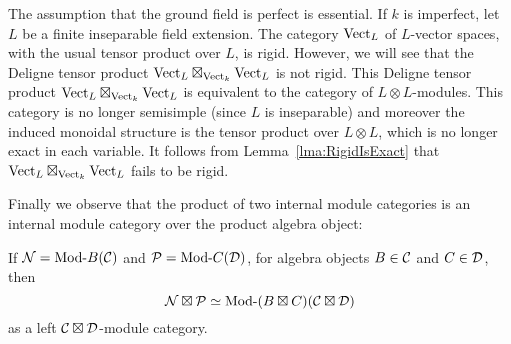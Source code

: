 \documentclass{amsart}
\begin{document}
\begin{example}
	The assumption that the ground field is perfect is essential. If $k$ is imperfect, let $L$ be a finite inseparable field extension.  The category $\mathrm{Vect}_L$ of $L$-vector spaces, with the usual tensor product over $L$, is rigid.  However, we will see that the Deligne tensor product $\mathrm{Vect}_L \boxtimes_{\mathrm{Vect}_k} \mathrm{Vect}_L$ is not rigid.  This Deligne tensor product $\mathrm{Vect}_L \boxtimes_{\mathrm{Vect}_k} \mathrm{Vect}_L$ is equivalent to the category of $L \otimes L$-modules. This category is no longer semisimple (since $L$ is inseparable) and moreover the induced monoidal structure is the tensor product over $L \otimes L$, which is no longer exact in each variable. It follows from Lemma~\ref{lma:RigidIsExact} that $\mathrm{Vect}_L \boxtimes_{\mathrm{Vect}_k} \mathrm{Vect}_L$ fails to be rigid. 
\end{example}  

Finally we observe that the product of two internal module categories is an internal module category over the product algebra object:

\begin{proposition}
	If $\cN = \Mod{}{B}(\cC)$ and $\cP = \Mod{}{C}(\cD)$, for algebra objects $B \in \mathcal C$ and $C \in \mathcal D$, then $$\cN \boxtimes \cP \simeq \Mod{}{(B \boxtimes C)}(\cC \boxtimes \cD)$$ as a left $\mathcal C \boxtimes \mathcal D$-module category.
\end{proposition}
\end{document}
